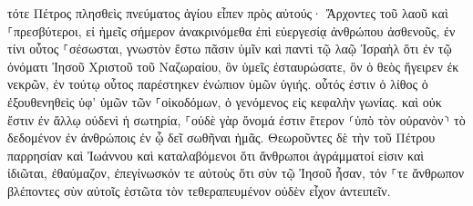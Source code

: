\documentclass{openreader}
\begin{document}
τότε Πέτρος πλησθεὶς πνεύματος ἁγίου εἶπεν πρὸς αὐτούς· Ἄρχοντες τοῦ λαοῦ καὶ ⸀πρεσβύτεροι, 
εἰ ἡμεῖς σήμερον ἀνακρινόμεθα ἐπὶ εὐεργεσίᾳ ἀνθρώπου ἀσθενοῦς, ἐν τίνι οὗτος ⸀σέσωσται, 
γνωστὸν ἔστω πᾶσιν ὑμῖν καὶ παντὶ τῷ λαῷ Ἰσραὴλ ὅτι ἐν τῷ ὀνόματι Ἰησοῦ Χριστοῦ τοῦ Ναζωραίου, ὃν ὑμεῖς ἐσταυρώσατε, ὃν ὁ θεὸς ἤγειρεν ἐκ νεκρῶν, ἐν τούτῳ οὗτος παρέστηκεν ἐνώπιον ὑμῶν ὑγιής. 
οὗτός ἐστιν ὁ λίθος ὁ ἐξουθενηθεὶς ὑφ’ ὑμῶν τῶν ⸀οἰκοδόμων, ὁ γενόμενος εἰς κεφαλὴν γωνίας. 
καὶ οὐκ ἔστιν ἐν ἄλλῳ οὐδενὶ ἡ σωτηρία, ⸀οὐδὲ γὰρ ὄνομά ἐστιν ἕτερον ⸂ὑπὸ τὸν οὐρανὸν⸃ τὸ δεδομένον ἐν ἀνθρώποις ἐν ᾧ δεῖ σωθῆναι ἡμᾶς. 
Θεωροῦντες δὲ τὴν τοῦ Πέτρου παρρησίαν καὶ Ἰωάννου καὶ καταλαβόμενοι ὅτι ἄνθρωποι ἀγράμματοί εἰσιν καὶ ἰδιῶται, ἐθαύμαζον, ἐπεγίνωσκόν τε αὐτοὺς ὅτι σὺν τῷ Ἰησοῦ ἦσαν, 
τόν ⸀τε ἄνθρωπον βλέποντες σὺν αὐτοῖς ἑστῶτα τὸν τεθεραπευμένον οὐδὲν εἶχον ἀντειπεῖν. 
\end{document}
